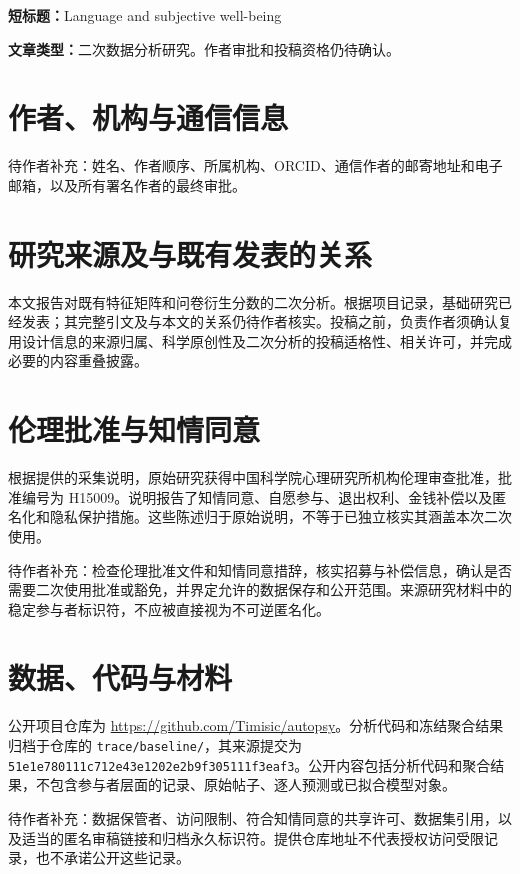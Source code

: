 

\noindent\textbf{短标题：}Language and subjective well-being

\noindent\textbf{文章类型：}二次数据分析研究。作者审批和投稿资格仍待确认。

\section{作者、机构与通信信息}
待作者补充：姓名、作者顺序、所属机构、ORCID、通信作者的邮寄地址和电子邮箱，以及所有署名作者的最终审批。

\section{研究来源及与既有发表的关系}
本文报告对既有特征矩阵和问卷衍生分数的二次分析。根据项目记录，基础研究已经发表；其完整引文及与本文的关系仍待作者核实。投稿之前，负责作者须确认复用设计信息的来源归属、科学原创性及二次分析的投稿适格性、相关许可，并完成必要的内容重叠披露。

\section{伦理批准与知情同意}
根据提供的采集说明，原始研究获得中国科学院心理研究所机构伦理审查批准，批准编号为 H15009。说明报告了知情同意、自愿参与、退出权利、金钱补偿以及匿名化和隐私保护措施。这些陈述归于原始说明，不等于已独立核实其涵盖本次二次使用。

待作者补充：检查伦理批准文件和知情同意措辞，核实招募与补偿信息，确认是否需要二次使用批准或豁免，并界定允许的数据保存和公开范围。来源研究材料中的稳定参与者标识符，不应被直接视为不可逆匿名化。

\section{数据、代码与材料}
公开项目仓库为 \url{https://github.com/Timisic/autopsy}。分析代码和冻结聚合结果归档于仓库的 \texttt{trace/baseline/}，其来源提交为 \texttt{51e1e780111c712e43e1202e2b9f305111f3eaf3}。公开内容包括分析代码和聚合结果，不包含参与者层面的记录、原始帖子、逐人预测或已拟合模型对象。

待作者补充：数据保管者、访问限制、符合知情同意的共享许可、数据集引用，以及适当的匿名审稿链接和归档永久标识符。提供仓库地址不代表授权访问受限记录，也不承诺公开这些记录。

